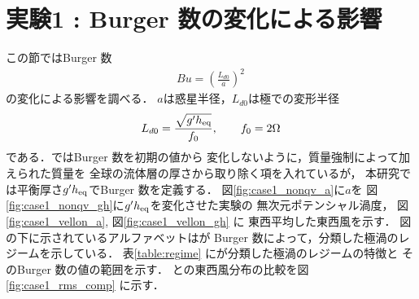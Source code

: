 \documentclass[a4j,12pt,openbib,oneside]{jreport}
\begin{document}
%
\clearpage
\newpage
\section{実験1 : Burger 数の変化による影響}
\label{sec:case1}
この節ではBurger 数 
\begin{align}
Bu = \left (\frac{L_{d0}}{a} \right )^2 \label{burger}
\end{align}
の変化による影響を調べる．
$a$は惑星半径，$L_{d0}$は極での変形半径
\begin{align}
L_{d0} = \frac{\sqrt{g'h_{{\rm{eq}}}}}{f_0}, \qquad f_0 = 2 \Omega
\end{align}
である．\cite{Brueshaber2019}ではBurger 数を初期の値から
変化しないように，質量強制によって加えられた質量を
全球の流体層の厚さから取り除く項を入れているが，
本研究では平衡厚さ$g'h_{{\rm{eq}}}$でBurger 数を定義する．
%
%
図\ref{fig:case1_nonqv_a}に$a$を
図\ref{fig:case1_nonqv_gh}に$g'h_{\rm{eq}}$を変化させた実験の
無次元ポテンシャル渦度，
図\ref{fig:case1_vellon_a}, 図\ref{fig:case1_vellon_gh} に
東西平均した東西風を示す．
%
図の下に示されているアルファベットは\cite{Brueshaber2019}が
Burger 数によって，分類した極渦のレジームを示している．
表\ref{table:regime} に\cite{Brueshaber2019}が分類した極渦のレジームの特徴と
そのBurger 数の値の範囲を示す．
\cite{Showman2007} との東西風分布の比較を図\ref{fig:case1_rms_comp} に示す．
%
%
%
%
%
%
% 
\end{document}

